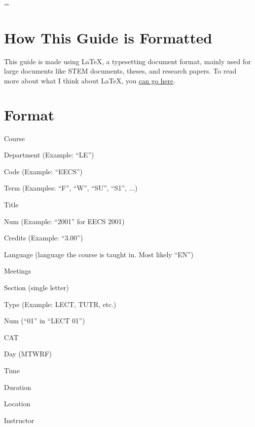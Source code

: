 \emergencystretch=\maxdimen
{}

\maketitle              %

\section{How This Guide is Formatted}
This guide is made using \LaTeX{}, a typesetting document format, mainly used
for large documents like STEM documents, theses, and research papers. To read
more about what I think about \LaTeX{}, you
\href{https://husseinesmail.xyz/articles/is-latex-better.html}{can go here}.

\section{Format}
\noindent Course
\begin{itemize*}
	\item Department (Example: ``LE'')
	\item Code (Example: ``EECS'')
	\item Term (Examples: ``F'', ``W'', ``SU'', ``S1'', ...)
	\item Title
	\item Num (Example: ``2001'' for EECS 2001)
	\item Credits (Example: ``3.00'')
	\item Language (language the course is taught in. Most likely ``EN'')
	\item Meetings
	\begin{itemize*}
		\item Section (single letter)
		\item Type (Example: LECT, TUTR, etc.)
		\item Num (``01'' in ``LECT 01'')
		\item CAT
		\item Day (MTWRF)
		\item Time
		\item Duration
		\item Location
		\item Instructor
	\end{itemize*}
\end{itemize*}


